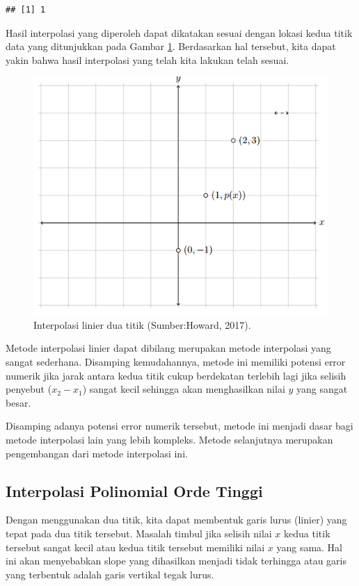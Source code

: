\documentclass[]{book}
\theoremstyle{definition}
\theoremstyle{definition}
\theoremstyle{definition}
\theoremstyle{remark}
\begin{document}
\begin{verbatim}
## [1] 1
\end{verbatim}

Hasil interpolasi yang diperoleh dapat dikatakan sesuai dengan lokasi kedua titik data yang ditunjukkan pada Gambar \ref{fig:linviz}. Berdasarkan hal tersebut, kita dapat yakin bahwa hasil interpolasi yang telah kita lakukan telah sesuai.

\begin{figure}

{\centering \includegraphics[width=0.8\linewidth]{./images/linviz} 

}

\caption{Interpolasi linier dua titik 
(Sumber:Howard, 2017).}\label{fig:linviz}
\end{figure}

Metode interpolasi linier dapat dibilang merupakan metode interpolasi yang sangat sederhana. Disamping kemudahannya, metode ini memiliki potensi error numerik jika jarak antara kedua titik cukup berdekatan terlebih lagi jika selisih penyebut (\(x_2-x_1\)) sangat kecil sehingga akan menghasilkan nilai \(y\) yang sangat besar.

Disamping adanya potensi error numerik tersebut, metode ini menjadi dasar bagi metode interpolasi lain yang lebih kompleks. Metode selanjutnya merupakan pengembangan dari metode interpolasi ini.

\hypertarget{hopoliinter}{%
\subsection{Interpolasi Polinomial Orde Tinggi}\label{hopoliinter}}

Dengan menggunakan dua titik, kita dapat membentuk garis lurus (linier) yang tepat pada dua titik tersebut. Masalah timbul jika selisih nilai \(x\) kedua titik tersebut sangat kecil atau kedua titik tersebut memiliki nilai \(x\) yang sama. Hal ini akan menyebabkan slope yang dihasilkan menjadi tidak terhingga atau garis yang terbentuk adalah garis vertikal tegak lurus.
\end{document}
